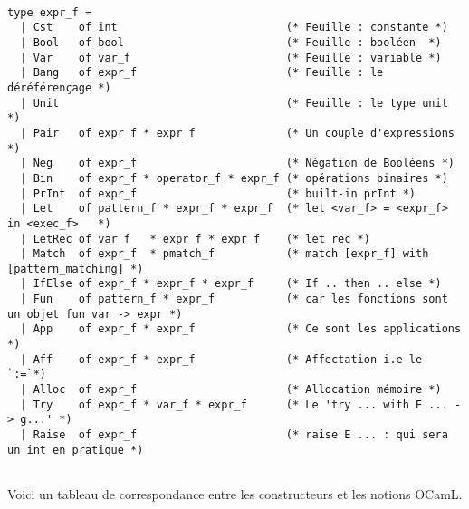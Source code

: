 \documentclass{article}
\begin{document}
	\begin{verbatim}
	
type expr_f =
  | Cst    of int                          (* Feuille : constante *)
  | Bool   of bool                         (* Feuille : booléen  *)
  | Var    of var_f                        (* Feuille : variable *)
  | Bang   of expr_f                       (* Feuille : le déréférençage *)
  | Unit                                   (* Feuille : le type unit *)
  | Pair   of expr_f * expr_f              (* Un couple d'expressions *)
  | Neg    of expr_f                       (* Négation de Booléens *)
  | Bin    of expr_f * operator_f * expr_f (* opérations binaires *)
  | PrInt  of expr_f                       (* built-in prInt *)
  | Let    of pattern_f * expr_f * expr_f  (* let <var_f> = <expr_f> in <exec_f>   *)
  | LetRec of var_f   * expr_f * expr_f    (* let rec *)
  | Match  of expr_f  * pmatch_f           (* match [expr_f] with [pattern_matching] *)
  | IfElse of expr_f * expr_f * expr_f     (* If .. then .. else *)
  | Fun    of pattern_f * expr_f           (* car les fonctions sont un objet fun var -> expr *)
  | App    of expr_f * expr_f              (* Ce sont les applications *)
  | Aff    of expr_f * expr_f              (* Affectation i.e le `:=`*)
  | Alloc  of expr_f                       (* Allocation mémoire *)
  | Try    of expr_f * var_f * expr_f      (* Le 'try ... with E ... -> g...' *)
  | Raise  of expr_f                       (* raise E ... : qui sera un int en pratique *)


	\end{verbatim}
	
	\vspace{0.5cm}
	Voici un tableau de correspondance entre les constructeurs et les notions OCamL.
	
\end{document}
